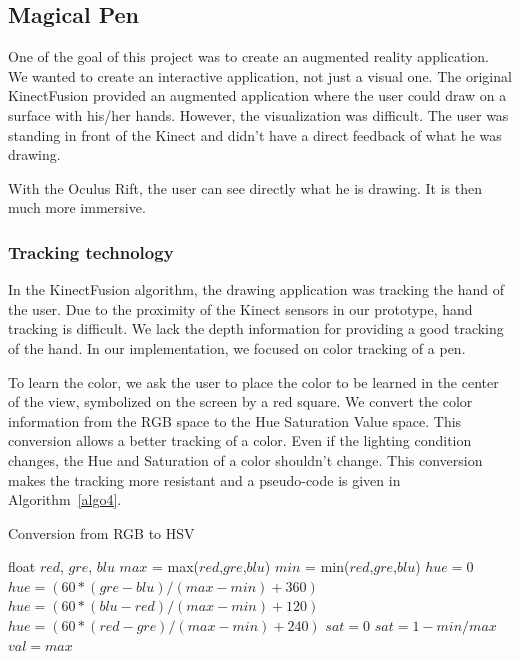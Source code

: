 \documentclass[12pt]{article}
\begin{document}
\subsection{Magical Pen}
One of the goal of this project was to create an augmented reality application. We wanted to create an interactive application, not just a visual one. The original KinectFusion provided an augmented application where the user could draw on a surface with his/her hands. However, the visualization was difficult. The user was standing in front of the Kinect and didn't have a direct feedback of what he was drawing.

With the Oculus Rift, the user can see directly what he is drawing. It is then much more immersive.

\subsubsection{Tracking technology}
In the KinectFusion algorithm, the drawing application was tracking the hand of the user. Due to the proximity of the Kinect sensors in our prototype, hand tracking is difficult. We lack the depth information for providing a good tracking of the hand. In our implementation, we focused on color tracking of a pen.

To learn the color, we ask the user to place the color to be learned in the center of the view, symbolized on the screen by a red square. We convert the color information from the RGB space to the Hue Saturation Value space. This conversion allows a better tracking of a color. Even if the lighting condition changes, the Hue and Saturation of a color shouldn't change. This conversion makes the tracking more resistant and a pseudo-code is given in Algorithm~\ref{algo4}.

\begin{algorithm}
\caption{Conversion from RGB to HSV}\label{algo4}
\begin{algorithmic}[1]
\State float $red$, $gre$, $blu$
\State $max$ = max($red$,$gre$,$blu$)
\State $min$ = min($red$,$gre$,$blu$)
  \State $hue = 0$
  \State $hue = (60*(gre-blu)/(max-min) + 360)$
  \EndIf
{}
  \State $hue = (60*(blu-red)/(max-min) + 120)$
\Else
  \State $hue = (60*(red-gre)/(max-min) + 240)$
\EndIf
{}
  \State $sat = 0$
\Else
  \State $sat = 1-min/max$
\EndIf
\State $val = max$
\end{algorithmic}
\end{algorithm}
\end{document}
